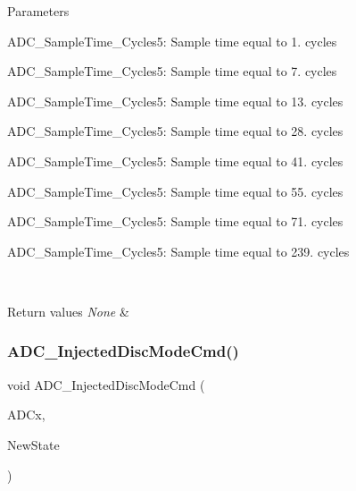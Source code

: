 \begin{DoxyParams}{Parameters}
\begin{DoxyItemize}
\item A\+D\+C\+\_\+\+Sample\+Time\+\_\+Cycles5\+: Sample time equal to 1. cycles \item A\+D\+C\+\_\+\+Sample\+Time\+\_\+Cycles5\+: Sample time equal to 7. cycles \item A\+D\+C\+\_\+\+Sample\+Time\+\_\+Cycles5\+: Sample time equal to 13. cycles \item A\+D\+C\+\_\+\+Sample\+Time\+\_\+Cycles5\+: Sample time equal to 28. cycles \item A\+D\+C\+\_\+\+Sample\+Time\+\_\+Cycles5\+: Sample time equal to 41. cycles \item A\+D\+C\+\_\+\+Sample\+Time\+\_\+Cycles5\+: Sample time equal to 55. cycles \item A\+D\+C\+\_\+\+Sample\+Time\+\_\+Cycles5\+: Sample time equal to 71. cycles \item A\+D\+C\+\_\+\+Sample\+Time\+\_\+Cycles5\+: Sample time equal to 239. cycles\end{DoxyItemize}
\\
\hline
\end{DoxyParams}

\begin{DoxyRetVals}{Return values}
{\em None} & \\
\hline
\end{DoxyRetVals}
\mbox{\label{group___a_d_c___private___functions_ga0b583b94183fa4ff287177b9ee808092}} 
\subsubsection{\texorpdfstring{ADC\_InjectedDiscModeCmd()}{ADC\_InjectedDiscModeCmd()}}
{\footnotesize\ttfamily void A\+D\+C\+\_\+\+Injected\+Disc\+Mode\+Cmd (\begin{DoxyParamCaption}\item[{\mbox{\hyperlink{struct_a_d_c___type_def}{A\+D\+C\+\_\+\+Type\+Def}} $\ast$}]{A\+D\+Cx,  }\item[{\mbox{\hyperlink{group___exported__types_gac9a7e9a35d2513ec15c3b537aaa4fba1}{Functional\+State}}}]{New\+State }\end{DoxyParamCaption})}



